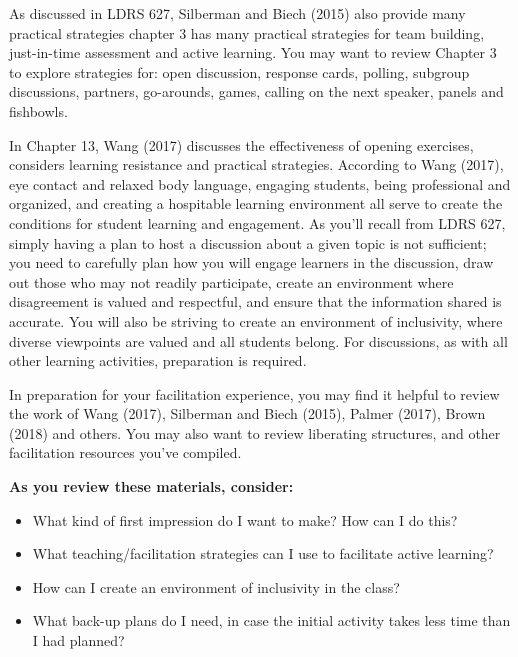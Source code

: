 \documentclass[
]{book}
\providecommand{\tightlist}{%
  \setlength{\itemsep}{0pt}\setlength{\parskip}{0pt}}
\begin{document}
As discussed in LDRS 627, Silberman and Biech (2015) also provide many practical strategies chapter 3 has many practical strategies for team building, just-in-time assessment and active learning. You may want to review Chapter 3 to explore strategies for: open discussion, response cards, polling, subgroup discussions, partners, go-arounds, games, calling on the next speaker, panels and fishbowls.

In Chapter 13, Wang (2017) discusses the effectiveness of opening exercises, considers learning resistance and practical strategies. According to Wang (2017), eye contact and relaxed body language, engaging students, being professional and organized, and creating a hospitable learning environment all serve to create the conditions for student learning and engagement.
As you'll recall from LDRS 627, simply having a plan to host a discussion about a given topic is not sufficient; you need to carefully plan how you will engage learners in the discussion, draw out those who may not readily participate, create an environment where disagreement is valued and respectful, and ensure that the information shared is accurate. You will also be striving to create an environment of inclusivity, where diverse viewpoints are valued and all students belong. For discussions, as with all other learning activities, preparation is required.

In preparation for your facilitation experience, you may find it helpful to review the work of Wang (2017), Silberman and Biech (2015), Palmer (2017), Brown (2018) and others. You may also want to review liberating structures, and other facilitation resources you've compiled.

\textbf{As you review these materials, consider:}

\begin{itemize}
\tightlist
\item
  What kind of first impression do I want to make? How can I do this?\\
\item
  What teaching/facilitation strategies can I use to facilitate active learning?\\
\item
  How can I create an environment of inclusivity in the class?\\
\item
  What back-up plans do I need, in case the initial activity takes less time than I had planned?
\end{itemize}
\end{document}

